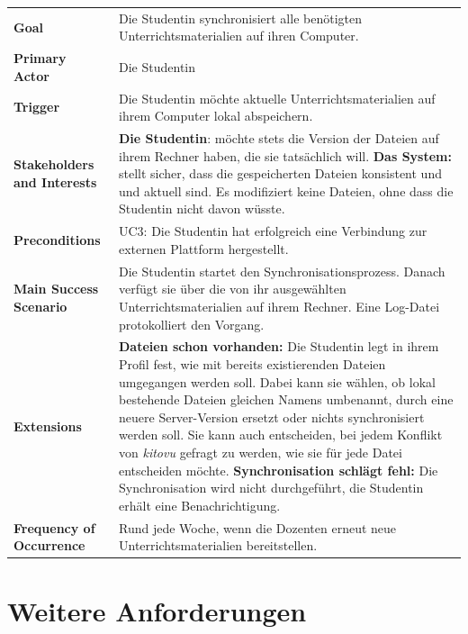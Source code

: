 \documentclass[a4paper]{article}
\let\oldsection\section
\renewcommand\section{\clearpage\oldsection}
\begin{document}
\begin{tabulary}{\linewidth}{lp{30em}}
	\textbf{Goal} & Die Studentin synchronisiert alle benötigten Unterrichtsmaterialien auf ihren Computer. \\
	\textbf{Primary Actor} & Die Studentin \\
	\textbf{Trigger} & Die Studentin möchte aktuelle Unterrichtsmaterialien auf ihrem Computer lokal abspeichern. \\
	\textbf{Stakeholders and Interests} & \textbf{Die Studentin}: möchte stets die Version der Dateien auf ihrem Rechner haben, die sie tatsächlich will. \textbf{Das System:}  stellt sicher, dass die gespeicherten Dateien konsistent und und aktuell sind. Es modifiziert keine Dateien, ohne dass die Studentin nicht davon wüsste.\\
	\textbf{Preconditions} & UC3: Die Studentin hat erfolgreich eine Verbindung zur externen Plattform hergestellt. \\
	\textbf{Main Success Scenario} & Die Studentin startet den Synchronisationsprozess. Danach verfügt sie über die von ihr ausgewählten Unterrichtsmaterialien auf ihrem Rechner. Eine Log-Datei protokolliert den Vorgang. \\
	\textbf{Extensions} & \textbf{Dateien schon vorhanden:} Die Studentin legt in ihrem Profil fest, wie mit bereits existierenden Dateien umgegangen werden soll. Dabei kann sie wählen, ob lokal bestehende Dateien gleichen Namens umbenannt, durch eine neuere Server-Version ersetzt oder nichts synchronisiert werden soll. Sie kann auch entscheiden, bei jedem Konflikt von \emph{kitovu} gefragt zu werden, wie sie für jede Datei entscheiden möchte. \textbf{Synchronisation schlägt fehl:} Die Synchronisation wird nicht durchgeführt, die Studentin erhält eine Benachrichtigung.\\
	\textbf{Frequency of Occurrence} & Rund jede Woche, wenn die Dozenten erneut neue Unterrichtsmaterialien bereitstellen.  \\
\end{tabulary}

\pagebreak
\section{Weitere Anforderungen}
\end{document}
